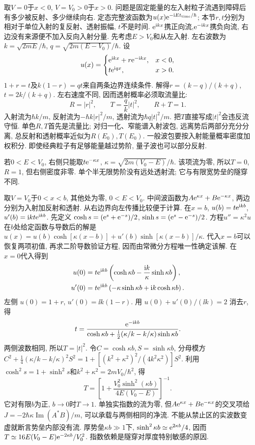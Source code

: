 取$V=0$于$x<0$, $V=V_0>0$于$x>0$. 问题是固定能量的左入射粒子流遇到障碍后有多少被反射、多少继续向右. 定态完整波函数为$u(x)\mathrm e^{-\mathrm i E t_{\rm time}/\hbar}$; 本节$r,t$分别为相对于单位入射的复反射、透射振幅, $t$不是时间. $\mathrm e^{\mathrm i kx}$携正向流,$\mathrm e^{-\mathrm i kx}$携负向流, 右边没有来源便不加入反向入射分量. 先考虑$E>V_0$和从左入射. 左右波数为$k=\sqrt{2mE}/\hbar$, $q=\sqrt{2m(E-V_0)}/\hbar$. 设
\[
u(x)=\begin{cases}
\mathrm e^{\mathrm i kx}+r\mathrm e^{-\mathrm i kx},&x<0,\\
t\mathrm e^{\mathrm i qx},&x>0.
\end{cases}
\]
$1+r=t$及$k(1-r)=qt$来自两条边界连续条件. 解得$r=(k-q)/(k+q)$, $t=2k/(k+q)$. 左右速度不同, 因而透射概率必须取流量比:
\[
R=|r|^2,\qquad T=\frac qk|t|^2,
\qquad R+T=1.
\]
入射流为$\hbar k/m$, 反射流为$-\hbar k|r|^2/m$, 透射流为$\hbar q|t|^2/m$. 把$T$直接写成$|t|^2$会违反流守恒. 单色$R,T$首先是流量比; 对归一化、窄能谱入射波包, 远离势后两部分充分分离, 总反射和透射概率近似为$R(E_0),T(E_0)$. 一般波包要按入射能量概率密度加权积分. 即使经典粒子有足够能量越过势阶, 量子波也可以部分反射.

若$0<E<V_0$, 右侧只能取$t\mathrm e^{-\kappa x}$, $\kappa=\sqrt{2m(V_0-E)}/\hbar$. 该项流为零, 所以$T=0$, $R=1$, 但右侧密度非零. 单个半无限势阶没有远处透射流; 它与有限宽势垒的隧穿不同.

取$V=V_0$于$0<x<b$, 其他处为零, $0<E<V_0$. 中间波函数为$A\mathrm e^{\kappa x}+B\mathrm e^{-\kappa x}$, 两边分别为入射加反射和透射. 从右边界向左传播比较便于计算. 在$x=b$, $u(b)=t\mathrm e^{\mathrm i kb}$, $u'(b)=\mathrm i kt\mathrm e^{\mathrm i kb}$. 先定义 $\cosh s=(\mathrm e^s+\mathrm e^{-s})/2$, $\sinh s=(\mathrm e^s-\mathrm e^{-s})/2$. 方程$u''=\kappa^2u$在$b$处给定函数与导数后的解是
$u(x)=u(b)\cosh[\kappa(x-b)]+u'(b)\sinh[\kappa(x-b)]/\kappa$.
代入$x=b$可以恢复两项初值, 再求二阶导数验证方程, 因而由常微分方程唯一性确定该解. 在$x=0$代入得到
\begin{align*}
u(0)&=t\mathrm e^{\mathrm i kb}\left(\cosh\kappa b-\frac{\mathrm i k}{\kappa}\sinh\kappa b\right),\\
u'(0)&=t\mathrm e^{\mathrm i kb}\left(-\kappa\sinh\kappa b+\mathrm i k\cosh\kappa b\right).
\end{align*}
左侧 $u(0)=1+r$, $u'(0)=\ii k(1-r)$. 用 $u(0)+u'(0)/(\ii k)=2$ 消去$r$, 得
\[
t=\frac{\mathrm e^{-\mathrm i kb}}
{\cosh\kappa b+\frac{\mathrm i}{2}(\kappa/k-k/\kappa)\sinh\kappa b}.
\]
两侧波数相同, 所以$T=|t|^2$. 令$C=\cosh\kappa b,S=\sinh\kappa b$, 分母模方$C^2+\tfrac14(\kappa/k-k/\kappa)^2S^2=1+[(k^2+\kappa^2)^2/(4k^2\kappa^2)]S^2$. 利用$\cosh^2s=1+\sinh^2s$和$k^2+\kappa^2=2mV_0/\hbar^2$, 得
\begin{equation}\label{eq:tunnel}
T=\left[1+\frac{V_0^2\sinh^2(\kappa b)}{4E(V_0-E)}\right]^{-1}.
\end{equation}
它对有限$b$为正, $b\to0$时$T\to1$. 单独实指数的流为零, 但$A\mathrm e^{\kappa x}+B\mathrm e^{-\kappa x}$的交叉项给$J=-2\hbar\kappa\operatorname{Im}(A^*B)/m$, 可以承载与两侧相同的净流. 不能从禁止区的实波数变虚就断言势垒内部没有流. 厚势垒$\kappa b\gg1$下, $\sinh^2\kappa b\simeq\mathrm e^{2\kappa b}/4$, 因而$T\simeq16E(V_0-E)\mathrm e^{-2\kappa b}/V_0^2$. 指数依赖是隧穿对厚度特别敏感的原因.

